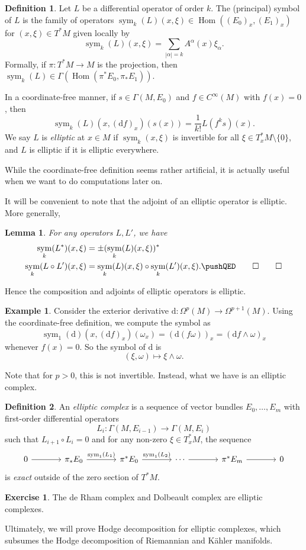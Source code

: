 \documentclass{shortart}
\newtheorem*{lemma}{Lemma}
\theoremstyle{definition}
\newtheorem*{defi}{Definition}
\newtheorem*{eg}{Example}
\newtheorem*{ex}{Exercise}
\renewcommand\d{\mathrm{d}}
\DeclareMathOperator\Hom{Hom}
\DeclareMathOperator\symb{sym}
\begin{document}
\begin{defi}
  Let $L$ be a differential operator of order $k$. The (principal) symbol of $L$ is the family of operators $\symb_k(L)(x, \xi)\in \Hom((E_0)_x, (E_1)_x)$ for $(x, \xi) \in T^*M$ given locally by
  \[
    \symb_k (L)(x, \xi) = \sum_{|\alpha| = k} A^\alpha(x) \xi_\alpha.
  \]
  Formally, if $\pi: T^*M \to M$ is the projection, then $\symb_k(L) \in \Gamma(\Hom(\pi^* E_0, \pi_* E_1))$.

  In a coordinate-free manner, if $s \in \Gamma(M, E_0)$ and $f \in C^\infty(M)$ with $f(x) = 0$, then
  \[
    \symb_k (L)(x, (\d f)_x)(s(x)) = \frac{1}{k!} L(f^k s)(x).
  \]
  We say $L$ is \emph{elliptic} at $x \in M$ if $\symb_k(x, \xi)$ is invertible for all $\xi \in T^*_x M \setminus \{0\}$, and $L$ is elliptic if it is elliptic everywhere.
\end{defi}
While the coordinate-free definition seems rather artificial, it is actually useful when we want to do computations later on.

It will be convenient to note that the adjoint of an elliptic operator is elliptic. More generally,
\begin{lemma}
  For any operators $L, L'$, we have
  \begin{align*}
    \symb_k(L^*)(x, \xi) &= \pm (\symb_k(L)(x, \xi))^*\\
    \symb_k(L \circ L')(x, \xi) &= \symb_k(L)(x, \xi) \circ \symb_k(L')(x, \xi).\fakeqed
  \end{align*}
\end{lemma}
Hence the composition and adjoints of elliptic operators is elliptic.

\begin{eg}
  Consider the exterior derivative $\d: \Omega^p(M) \to \Omega^{p + 1}(M)$. Using the coordinate-free definition, we compute the symbol as
  \[
    \symb_1(\d)(x, (\d f)_x)(\omega_x) = (\d (f\omega))_x = (\d f \wedge \omega)_x
  \]
  whenever $f(x) = 0$. So the symbol of $\d$ is
  \[
    (\xi, \omega) \mapsto \xi \wedge \omega.
  \]
\end{eg}
Note that for $p > 0$, this is not invertible. Instead, what we have is an elliptic complex.
\begin{defi}
  An \emph{elliptic complex} is a sequence of vector bundles $E_0, \ldots, E_m$ with first-order differential operators
  \[
    L_i: \Gamma(M, E_{i - 1}) \to \Gamma(M, E_i)
  \]
  such that $L_{i + 1} \circ L_i = 0$ and for any non-zero $\xi \in T^*_x M$, the sequence
  \[
    \begin{tikzcd}[column sep=large]
      0 \ar[r] & \pi_* E_0 \ar[r, "\symb_1(L_1)"] & \pi^* E_0 \ar[r, "\symb_1(L_2)"] & \cdots \ar[r] & \pi^* E_m \ar[r] & 0
    \end{tikzcd}
  \]
  is \emph{exact} outside of the zero section of $T^*M$.
\end{defi}
\begin{ex}
  The de Rham complex and Dolbeault complex are elliptic complexes.
\end{ex}
Ultimately, we will prove Hodge decomposition for elliptic complexes, which subsumes the Hodge decomposition of Riemannian and K\"ahler manifolds.
\end{document}
